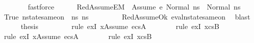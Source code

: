 \begin{isabellebody}
\ \ \ \ \ \ \isamarkupfalse%
\ fastforce\isanewline
\ \ \ \ \isamarkupfalse%
\ RedAssumeE{}{\isacharcolon}{\kern0pt}{\isachardoublequoteopen}M{\isacharcomma}{\kern0pt}{\isasymLambda}{\isacharcomma}{\kern0pt}{\isasymGamma}{\isacharcomma}{\kern0pt}{\isasymOmega}\ {\isasymturnstile}\ {\isasymlangle}Assume\ e{\isacharcomma}{\kern0pt}\ Normal\ ns{}{\isasymrangle}\ {\isasymrightarrow}\ Normal\ ns{}{\isachardoublequoteclose}\ \isamarkupfalse%
\ True\ {\isacartoucheopen}nstate{\isacharunderscore}{\kern0pt}same{\isacharunderscore}{\kern0pt}on\ {\isasymLambda}\ ns{}\ ns{}\ {\isacharbraceleft}{\kern0pt}{\isacharbraceright}{\kern0pt}{\isacartoucheclose}\isanewline
\ \ \ \ \ \ \isamarkupfalse%
\ RedAssumeOk\ eval{\isacharunderscore}{\kern0pt}nstate{\isacharunderscore}{\kern0pt}same{\isacharunderscore}{\kern0pt}on{\isacharparenleft}{\kern0pt}{}{\isacharparenright}{\kern0pt}\ \isamarkupfalse%
\ blast\isanewline
\ \ \ \ \isamarkupfalse%
\ {\isacharquery}{\kern0pt}thesis\ \isanewline
\ \ \ \ \ \ \isamarkupfalse%
\ {\isacharparenleft}{\kern0pt}rule\ exI{\isacharbrackleft}{\kern0pt}\ {\isacharquery}{\kern0pt}x{\isacharequal}{\kern0pt}{\isachardoublequoteopen}{\isacharparenleft}{\kern0pt}Assume\ e{\isacharparenright}{\kern0pt}{\isacharhash}{\kern0pt}cs{}A{\isachardoublequoteclose}{\isacharbrackright}{\kern0pt}{\isacharparenright}{\kern0pt}\isanewline
\ \ \ \ \ \ \isamarkupfalse%
\ {\isacharparenleft}{\kern0pt}rule\ exI{\isacharbrackleft}{\kern0pt}\ {\isacharquery}{\kern0pt}x{\isacharequal}{\kern0pt}cs{}B{\isacharbrackright}{\kern0pt}{\isacharparenright}{\kern0pt}\isanewline
\ \ \ \ \ \ \isamarkupfalse%
\ {\isacharparenleft}{\kern0pt}rule\ exI{\isacharbrackleft}{\kern0pt}\ {\isacharquery}{\kern0pt}x{\isacharequal}{\kern0pt}{\isachardoublequoteopen}{\isacharparenleft}{\kern0pt}Assume\ e{\isacharparenright}{\kern0pt}{\isacharhash}{\kern0pt}cs{}A{\isachardoublequoteclose}{\isacharbrackright}{\kern0pt}{\isacharparenright}{\kern0pt}\isanewline
\ \ \ \ \ \ \isamarkupfalse%
\ {\isacharparenleft}{\kern0pt}rule\ exI{\isacharbrackleft}{\kern0pt}\ {\isacharquery}{\kern0pt}x{\isacharequal}{\kern0pt}cs{}B{\isacharbrackright}{\kern0pt}{\isacharparenright}{\kern0pt}\isanewline
\ \ \ \ \ \ \isamarkupfalse%

\end{isabellebody}
